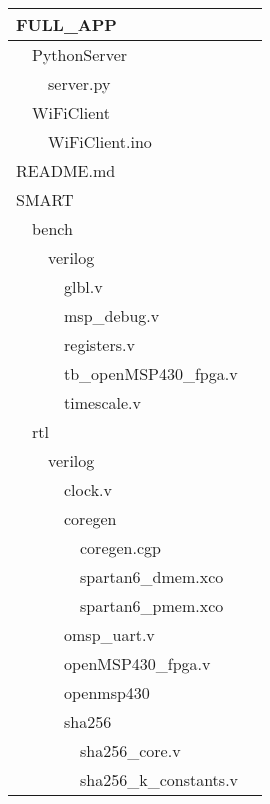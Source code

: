 \begin{longtable}{|p{0.15cm}|p{0.15cm}|p{0.15cm}|p{0.15cm}|p{0.15cm}|p{0.15cm}|p{8.6cm}|}
	\hline 
	\multicolumn{6}{|l|}{FULL\_APP} & \\
	\hline
	& \multicolumn{5}{l|}{PythonServer} & \\
	\hline
	& & \multicolumn{4}{l|}{server.py} & \\
	\hline
	& \multicolumn{5}{l|}{WiFiClient} & \\
	\hline
	& & \multicolumn{4}{l|}{WiFiClient.ino} & \\
	\hline
	\multicolumn{6}{|l|}{README.md} & \\
	\hline
	\multicolumn{6}{|l|}{SMART} & \\
	\hline
	& \multicolumn{5}{l|}{bench} & \\
	\hline
	& & \multicolumn{4}{l|}{verilog} & \\
	\hline
	& & & \multicolumn{3}{l|}{glbl.v} & \\
	\hline
	& & & \multicolumn{3}{l|}{msp\_debug.v} & \\
	\hline
	& & & \multicolumn{3}{l|}{registers.v} & \\
	\hline
	& & & \multicolumn{3}{l|}{tb\_openMSP430\_fpga.v} & \\
	\hline
	& & & \multicolumn{3}{l|}{timescale.v} & \\
	\hline
	& \multicolumn{5}{l|}{rtl} & \\
	\hline
	& & \multicolumn{4}{l|}{verilog} & \\
	\hline
	& & & \multicolumn{3}{l|}{clock.v} & \\
	\hline
	& & & \multicolumn{3}{l|}{coregen} & \\
	\hline
	& & & & \multicolumn{2}{l|}{coregen.cgp} & \\
	\hline
	& & & & \multicolumn{2}{l|}{spartan6\_dmem.xco} & \\
	\hline
	& & & & \multicolumn{2}{l|}{spartan6\_pmem.xco} & \\
	\hline
	& & & \multicolumn{3}{l|}{omsp\_uart.v} & \\
	\hline
	& & & \multicolumn{3}{l|}{openMSP430\_fpga.v} & \\
	\hline
	& & & \multicolumn{3}{l|}{openmsp430} & \\
	\hline
	& & & \multicolumn{3}{l|}{sha256} & \\
	\hline
	& & & & \multicolumn{2}{l|}{sha256\_core.v} & \\
	\hline
	& & & & \multicolumn{2}{l|}{sha256\_k\_constants.v} & \\

\end{longtable}
